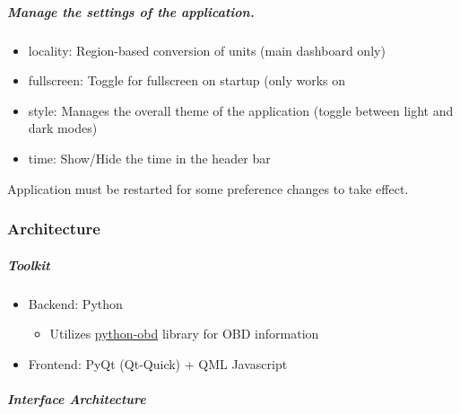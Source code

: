 \documentclass{article}
\providecommand{\tightlist}{%
  \setlength{\itemsep}{0pt}\setlength{\parskip}{0pt}}
\numberwithin{figure}{section}
\begin{document}
\subparagraph{Manage the settings of the application.}

\begin{itemize}
  \item
    locality: Region-based conversion of units (main dashboard only)
\end{itemize}
\begin{itemize}
  \item
    fullscreen: Toggle for fullscreen on startup (only works on
\end{itemize}
\begin{itemize}
  \item
    style: Manages the overall theme of the application (toggle between light and dark modes)
\end{itemize}
\begin{itemize}
  \item
    time: Show/Hide the time in the header bar
\end{itemize}

Application must be restarted for some preference changes to take effect.

\hypertarget{architecture}{%
\subsubsection{Architecture}\label{architecture}}

\hypertarget{toolkit}{%
\subparagraph{Toolkit}\label{Toolkit}}

\begin{itemize}
\item
  Backend: Python

  \begin{itemize}
  \tightlist
  \item
    Utilizes \href{https://python-obd.readthedocs.io/en/latest/}{python-obd} library for OBD information
  \end{itemize}
\item
  Frontend: PyQt (Qt-Quick) + QML \textbar{} Javascript
\end{itemize}

\hypertarget{interface-architecture}{%
\subparagraph{Interface Architecture}\label{interface-architecture}}
\end{document}
